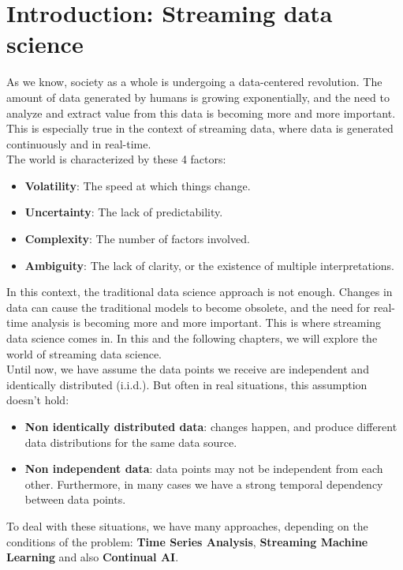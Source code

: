 \chapter{Introduction: Streaming data science}

As we know, society as a whole is undergoing a data-centered revolution.
The amount of data generated by humans is growing exponentially, and the
need to analyze and extract value from this data is becoming more and more
important. This is especially true in the context of streaming data, where
data is generated continuously and in real-time. \\

The world is characterized by these 4 factors:
\begin{itemize}
    \item \textbf{Volatility}: The speed at which things change.
    \item \textbf{Uncertainty}: The lack of predictability.
    \item \textbf{Complexity}: The number of factors involved.
    \item \textbf{Ambiguity}: The lack of clarity, or the existence of multiple interpretations.
\end{itemize}

In this context, the traditional data science approach is not enough. 
Changes in data can cause the traditional models to become
obsolete, and the need for real-time analysis is becoming more and more
important. This is where streaming data science comes in. In this and the 
following chapters, we will explore the world of streaming data science.\\

Until now, we have assume the data points we receive are independent and 
identically distributed (i.i.d.). But often in real situations,
this assumption doesn't hold:
\begin{itemize}
    \item \textbf{Non identically distributed data}: changes happen, and produce 
    different data distributions for the same data source.
    
    \item \textbf{Non independent data}: data points may not be independent from each
    other. Furthermore, in many cases we have a strong temporal dependency between
    data points.
\end{itemize}

To deal with these situations, we have many approaches, depending on the conditions of
the problem: \textbf{Time Series Analysis}, \textbf{Streaming Machine Learning} and also
\textbf{Continual AI}. 

